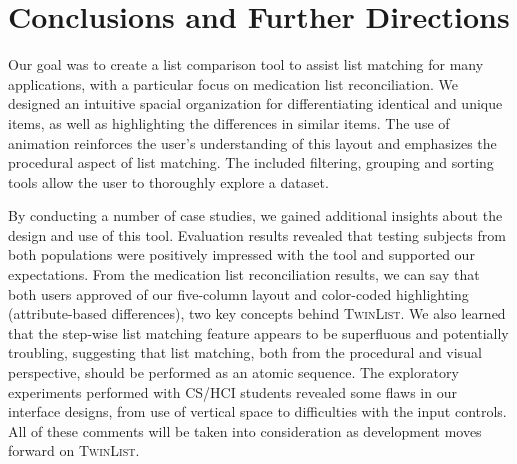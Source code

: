\documentclass{chi2009}
\newcommand{\TwinList}{\textsc{TwinList}}
\begin{document}
\section{Conclusions and Further Directions}
Our goal was to create a list comparison tool to assist list matching for many applications, with a particular focus on medication list reconciliation. We designed an intuitive spacial organization for differentiating identical and unique items, as well as highlighting the differences in similar items. The use of animation reinforces the user's understanding of this layout and emphasizes the procedural aspect of list matching. The included filtering, grouping and sorting tools allow the user to thoroughly explore a dataset.

By conducting a number of case studies, we gained additional insights about the design and use of this tool. Evaluation results revealed that testing subjects from both populations were positively impressed with the tool and supported our expectations. From the medication list reconciliation results, we can say that both users approved of our five-column layout and color-coded highlighting (attribute-based differences), two key concepts behind \TwinList. We also learned that the step-wise list matching feature appears to be superfluous and potentially troubling, suggesting that list matching, both from the procedural and visual perspective, should be performed as an atomic sequence. The exploratory experiments performed with CS/HCI students revealed some flaws in our interface designs, from use of vertical space to difficulties with the input controls. All of these comments will be taken into consideration as development moves forward on \TwinList.
 



\end{document}
